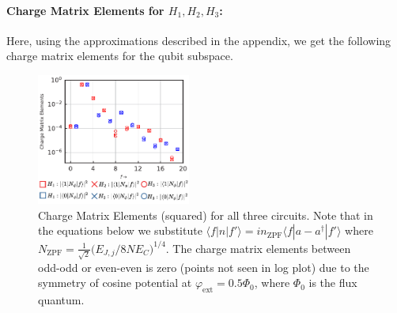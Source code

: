 \documentclass[%
reprint,
superscriptaddress,
 amsmath,amssymb,
 aps,
 prx,
longbibliography,
floatfix,
]{revtex4-2}
\begin{document}
\paragraph{Charge Matrix Elements for $H_1,H_2,H_3$:}
Here, using the approximations described in the appendix, we get the following charge matrix elements for the qubit subspace.
\begin{figure}[tbh]
    \centering
\includegraphics[width=0.45\textwidth]{Supp_Fig/Charge_Matrix.pdf}
    \caption{Charge Matrix 
 Elements (squared) for all three circuits. Note that in the equations below we substitute $\langle f|n|f'\rangle=in_{\mathrm{ZPF}}\langle f|a-a^\dagger|f'\rangle$ where $N_{\mathrm{ZPF}}=\frac{1}{\sqrt{2}}\Big(E_{J,j}/8NE_C\Big)^{1/4}$. The charge matrix elements between odd-odd or even-even is zero (points not seen in log plot) due to the symmetry of cosine potential at $\varphi_\mathrm{ext}=0.5\Phi_0$, where $\Phi_0$ is the flux quantum.}
    \label{charge-matrix}
\end{figure}
\end{document}

